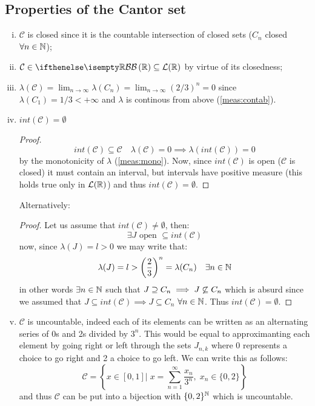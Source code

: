 \subsection{Properties of the Cantor set}
\begin{enumerate}[i)]
    \item $\mathcal{C}$ is closed since it is the countable intersection of closed sets ($C_n$ closed $\forall n\in\mathbb{N}$);
    \item $\mathcal{C} \in \B[\R] \subseteq \Leb(\R)$ by virtue of its closedness;
    \item $\lambda(\mathcal{C}) = \lim_{n\to\infty} \lambda(C_n) = \lim_{n\to\infty} (2/3)^n = 0$ since $\lambda(C_1) = 1/3 < +\infty$ and $\lambda$ is continous from above (\ref{meas:contab}).
    \item $int(\mathcal{C}) = \emptyset$ \\
        \begin{proof}
            \[
            int (\mathcal{C}) \subseteq \mathcal{C} \quad \lambda(\mathcal{C}) = 0 \implies \lambda(int(\mathcal{C})) = 0    
            \]
            by the monotonicity of $\lambda$ (\ref{meas:mono}). Now, since $int(\mathcal{C})$ is open ($\mathcal{C}$ is closed) it must contain an interval, but intervals have positive measure (this holds true only in $\mathcal{L}(\mathbb{R})$) and thus $int(\mathcal{C}) = \emptyset$.
        \end{proof}
        Alternatively:
        \begin{proof}
            Let us assume that $int(\mathcal{C}) \neq \emptyset$, then:
            \[
                \exists J \text{ open } \subseteq int(\mathcal{C})    
            \]
            now, since $\lambda(J)=l >0$ we may write that:
            \[
                \lambda(J) = l > \left( \frac{2}{3} \right)^n = \lambda(C_n) \quad \exists n \in\mathbb{N} 
            \]
            in other words $\exists n \in\mathbb{N}$ such that $J \supseteq C_n \implies J \centernot \subseteq C_n$ which is absurd since we assumed that $J \subseteq int (\mathcal{C}) \implies J \subseteq C_n$ $\forall n\in\mathbb{N}$. Thus $int(\mathcal{C}) = \emptyset$.
        \end{proof}
    \item $\mathcal{C}$ is uncountable, indeed each of its elements can be written as an alternating series of 0s and 2s divided by $3^n$. This would be equal to approximanting each element by going right or left through the sets $J_{n,k}$ where 0 represents a choice to go right and 2 a choice to go left. We can write this as follows:
        \[
            \mathcal{C} = \left\{ x\in [0,1] | \; x = \sum_{n=1}^\infty \frac{x_n}{3^n}, \; x_n \in \{0,2\} \right\}
        \]
        and thus $\mathcal{C}$ can be put into a bijection with $\{0,2\}^{\mathbb{N}}$ which is uncountable.
\end{enumerate}


